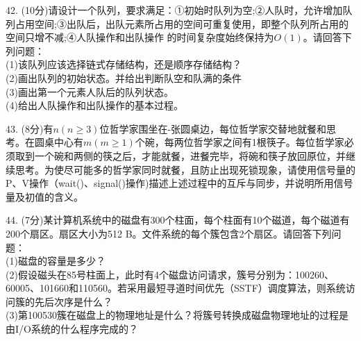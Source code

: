 42. (10分)请设计一个队列，要求满足：①初始时队列为空;②人队时，允许增加队列占用空间;③出队后，出队元素所占用的空间可重复使用，即整个队列所占用的空间只增不减;④人队操作和出队操作
的时间复杂度始终保持为$O(1)$。请回答下列问题： \\
(1)该队列应该选择链式存储结构，还是顺序存储结构？ \\
(2)画出队列的初始状态。并给出判断队空和队满的条件 \\
(3)画出第一个元素人队后的队列状态。 \\
(4)给出人队操作和出队操作的基本过程。

43. (8分)有$n(n\geqslant3)$位哲学家围坐在-张圆桌边，每位哲学家交替地就餐和思考。在圆桌中心有$m(m\geqslant1)$个碗，每两位哲学家之间有1根筷子。每位哲学家必须取到一个碗和两侧的筷之后，才能就餐，进餐完毕，将碗和筷子放回原位，并继续思考。为使尽可能多的哲学家同时就餐，且防止出现死锁现象，请使用信号量的P、V操作（wait()、signal()操作)描述上述过程中的互斥与同步，并说明所用信号量及初值的含义。

44. (7分)某计算机系统中的磁盘有300个柱面，每个柱面有10个磁道，每个磁道有200个扇区。扇区大小为512 B。文件系统的每个簇包含2个扇区。请回答下列问题： \\
(1)磁盘的容量是多少？ \\
(2)假设磁头在85号柱面上，此时有4个磁盘访问请求，簇号分别为：100260、60005、101660和110560。若采用最短寻道时间优先（SSTF）调度算法，则系统访问簇的先后次序是什么？ \\
(3)第100530簇在磁盘上的物理地址是什么？将簇号转换成磁盘物理地址的过程是由I/O系统的什么程序完成的？


